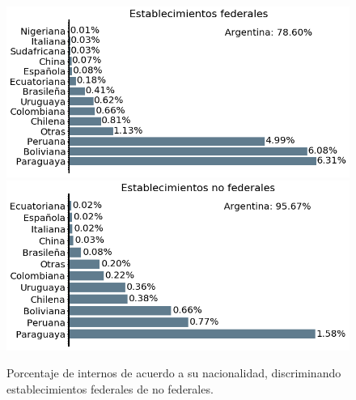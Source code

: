 \documentclass[10pt]{article}
\begin{document}
\begin{figure}[H]
	\centering
\includegraphics[scale=0.31]{graficos/nacionalidad_bar_federales.png}
\includegraphics[scale=0.31]{graficos/nacionalidad_bar_no_federales.png}
	\caption{Porcentaje de internos de acuerdo a su nacionalidad, discriminando establecimientos federales de no federales.\label{nacionalidad_discriminado}}
\end{figure}




\end{document}
